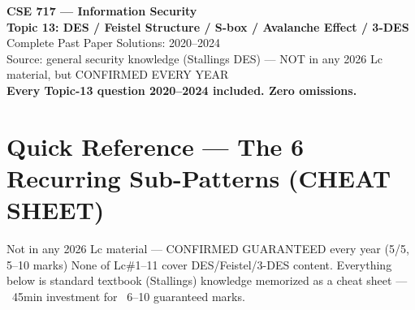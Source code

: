 \documentclass[12pt,a4paper]{article}
\begin{document}
\begin{center}
{\LARGE\bfseries\color{folblue} CSE 717 --- Information Security}\\[4pt]
{\large\bfseries Topic 13: DES / Feistel Structure / S-box / Avalanche Effect / 3-DES}\\[2pt]
{\large Complete Past Paper Solutions: 2020--2024}\\[6pt]
{\normalsize Source: general security knowledge (Stallings DES) --- NOT in any 2026 Lc material, but CONFIRMED EVERY YEAR}\\[2pt]
{\normalsize\color{darkred}\textbf{Every Topic-13 question 2020--2024 included. Zero omissions.}}
\end{center}

\tableofcontents
\newpage

\section*{Quick Reference --- The 6 Recurring Sub-Patterns (CHEAT SHEET)}

\begin{warnbox}{Not in any 2026 Lc material --- CONFIRMED GUARANTEED every year (5/5, 5--10 marks)}
None of Lc\#1--11 cover DES/Feistel/3-DES content. Everything below is standard textbook (Stallings) knowledge memorized as a cheat sheet --- ~45min investment for ~6--10 guaranteed marks.
\end{warnbox}
\end{document}
